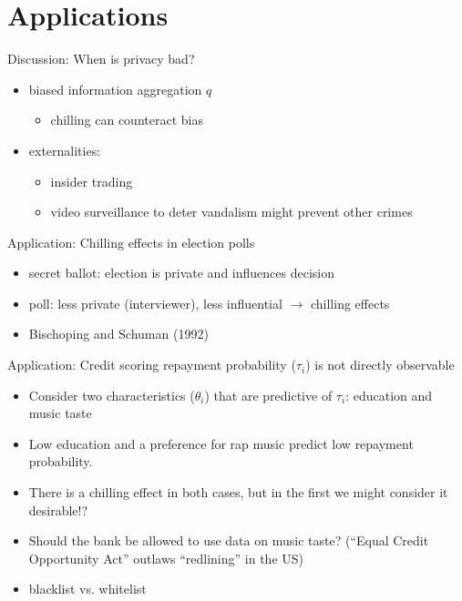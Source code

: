 \documentclass[bigger]{beamer}
\begin{document}
\section{Applications}
\label{sec:org63b8543}
\begin{frame}[label={sec:org777f5c5}]{Discussion: When is privacy bad?}
\begin{itemize}
\item biased information aggregation \(q\)
\begin{itemize}
\item chilling can counteract bias
\end{itemize}
\item externalities: 
\begin{itemize}
\item insider trading
\item video surveillance to deter vandalism might prevent other crimes
\end{itemize}
\end{itemize}
\end{frame}

\begin{frame}[label={sec:org31064fd}]{Application: Chilling effects in election polls}
\begin{itemize}
\item secret ballot: election is private and influences decision
\item poll: less private (interviewer), less influential \linebreak \(\rightarrow\) chilling effects
\item Bischoping and Schuman (1992)
\end{itemize}
\end{frame}

\begin{frame}[label={sec:org1be534e}]{Application: Credit scoring}
repayment probability (\(\tau_{i}\)) is not directly observable
\begin{itemize}
\item Consider two characteristics (\(\theta_{i}\)) that are predictive of \(\tau_{i}\): education and music taste
\item Low education and a preference for rap music predict low repayment probability.
\item There is a chilling effect in both cases, but in the first we might consider it desirable!?
\item Should the bank be allowed to use data on music taste? (``Equal Credit Opportunity Act'' outlaws ``redlining'' in the US)
\item blacklist vs. whitelist
\end{itemize}
\end{frame}
\end{document}
